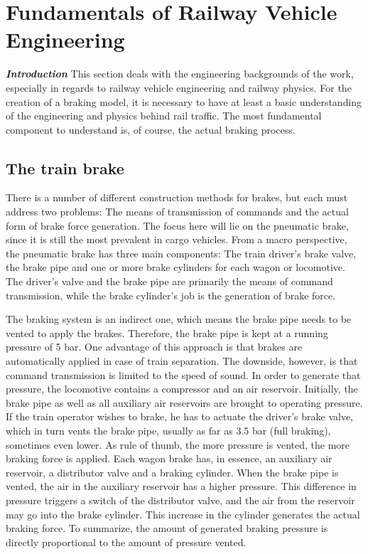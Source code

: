 \chapter{Fundamentals of Railway Vehicle Engineering}
\label{chap:FundamentalsOfRailwayVehicleEngineering}
\par\noindent
\textit{\textbf{Introduction}} This section deals with the engineering backgrounds of the work, especially in regards to railway vehicle engineering and railway physics. 
For the creation of a braking model, it is necessary to have at least a basic understanding of the engineering and physics behind rail traffic. The most fundamental component to understand is, of course, the actual braking process.

\section{The train brake}
\label{sec:TrainBrake}
\par\noindent
There is a number of different construction methods for brakes, but each must address two problems: The means of transmission of commands and the actual form of brake force generation. The focus here will lie on the pneumatic brake, since it is still the most prevalent in cargo vehicles. From a macro perspective, the pneumatic brake has three main components: The train driver's brake valve, the brake pipe and one or more brake cylinders for each wagon or locomotive. The driver's valve and the brake pipe are primarily the means of command transmission, while the brake cylinder's job is the generation of brake force. 

\par
The braking system is an indirect one, which means the brake pipe needs to be vented to apply the brakes. Therefore, the brake pipe is kept at a running pressure of 5 bar. One advantage of this approach is that brakes are automatically applied in case of train separation. The downside, however, is that command transmission is limited to the speed of sound. In order to generate that pressure, the locomotive contains a compressor and an air reservoir. Initially, the brake pipe as well as all auxiliary air reservoirs are brought to operating pressure. If the train operator wishes to brake, he has to actuate the driver's brake valve, which in turn vents the brake pipe, usually as far as 3.5 bar (full braking), sometimes even lower. As rule of thumb, the more pressure is vented, the more braking force is applied. Each wagon brake has, in essence, an auxiliary air reservoir, a distributor valve and a braking cylinder. When the brake pipe is vented, the air in the auxiliary reservoir has a higher pressure. This difference in pressure triggers a switch of the distributor valve, and the air from the reservoir may go into the brake cylinder. This increase in the cylinder generates the actual braking force. To summarize, the amount of generated braking pressure is directly proportional to the amount of pressure vented.

